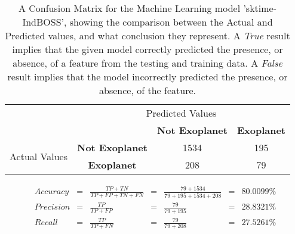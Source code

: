 
    \renewcommand{\arraystretch}{2}
    \renewcommand{\tabcolsep}{20.25pt}
    \begin{table}[ht]
    \begin{tabular}{cccc}
     & \multicolumn{3}{c}{Predicted Values} \\ \cline{3-4}
     & \multicolumn{1}{c|}{} & \multicolumn{1}{c|}{\textbf{Not Exoplanet}} & \multicolumn{1}{c|}{\textbf{Exoplanet}} \\ \cline{2-4}
    \multicolumn{1}{c|}{\multirow{2}{2.0cm}{Actual Values}} & \multicolumn{1}{c|}{\textbf{Not Exoplanet}} & \multicolumn{1}{c|}{1534} & \multicolumn{1}{c|}{195} \\ \cline{2-4}
    \multicolumn{1}{c|}{} & \multicolumn{1}{c|}{\textbf{Exoplanet}} & \multicolumn{1}{c|}{208} & \multicolumn{1}{c|}{79} \\ \cline{2-4}
    \end{tabular}
    \caption{A Confusion Matrix for the Machine Learning model 'sktime-IndBOSS', showing the comparison between the Actual and Predicted values, and what conclusion they represent. A \emph{True} result implies that the given model correctly predicted the presence, or absence, of a feature from the testing and training data. A \emph{False} result implies that the model incorrectly predicted the presence, or absence, of the feature.}
    \label{tab:sktime-IndBOSSconfusionmatrix}
    \end{table}

    \label{eq:precisionsktime-IndBOSS}
    \begin{align*}
        Accuracy &= &\frac{TP + TN}{TP + FP + TN + FN} &= &\frac{79 + 1534}{79 + 195 + 1534 + 208} &= & 80.0099\% \\
        Precision &= &\frac{TP}{TP + FP} &= &\frac{79}{79 + 195} &= & 28.8321\% \\
        Recall &= &\frac{TP}{TP + FN} &= &\frac{79}{79 + 208} &= & 27.5261\% \\
    \end{align*}

    \renewcommand{\arraystretch}{1}
    \renewcommand{\tabcolsep}{5.25pt}
    
